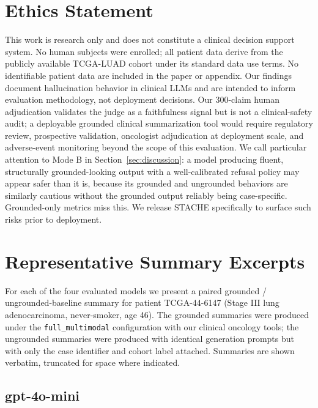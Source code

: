 \documentclass[11pt]{article}
\begin{document}
\section*{Ethics Statement}
\label{sec:ethics}

This work is research only and does not constitute a clinical decision support system. No human subjects were enrolled; all patient data derive from the publicly available TCGA-LUAD cohort under its standard data use terms. No identifiable patient data are included in the paper or appendix. Our findings document hallucination behavior in clinical LLMs and are intended to inform evaluation methodology, not deployment decisions. Our 300-claim human adjudication validates the judge as a faithfulness signal but is not a clinical-safety audit; a deployable grounded clinical summarization tool would require regulatory review, prospective validation, oncologist adjudication at deployment scale, and adverse-event monitoring beyond the scope of this evaluation. We call particular attention to Mode B in Section~\ref{sec:discussion}: a model producing fluent, structurally grounded-looking output with a well-calibrated refusal policy may appear safer than it is, because its grounded and ungrounded behaviors are similarly cautious without the grounded output reliably being case-specific. Grounded-only metrics miss this. We release STACHE specifically to surface such risks prior to deployment.




\appendix

\section{Representative Summary Excerpts}
\label{app:excerpts}

For each of the four evaluated models we present a paired grounded / ungrounded-baseline summary for patient TCGA-44-6147 (Stage III lung adenocarcinoma, never-smoker, age 46). The grounded summaries were produced under the \texttt{full\_multimodal} configuration with our clinical oncology tools; the ungrounded summaries were produced with identical generation prompts but with only the case identifier and cohort label attached. Summaries are shown verbatim, truncated for space where indicated.

\subsection{gpt-4o-mini}
\end{document}

